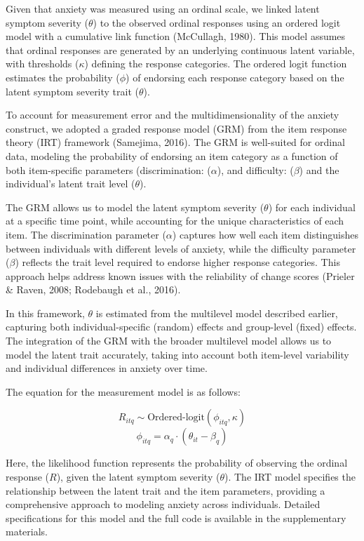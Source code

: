 \documentclass[
  man,floatsintext]{apa7}
\begin{document}
Given that anxiety was measured using an ordinal scale, we linked latent symptom severity (\(\theta\)) to the observed ordinal responses using an ordered logit model with a cumulative link function (McCullagh, 1980).
This model assumes that ordinal responses are generated by an underlying continuous latent variable, with thresholds (\(\kappa\)) defining the response categories.
The ordered logit function estimates the probability (\(\phi\)) of endorsing each response category based on the latent symptom severity trait (\(\theta\)).

To account for measurement error and the multidimensionality of the anxiety construct, we adopted a graded response model (GRM) from the item response theory (IRT) framework (Samejima, 2016).
The GRM is well-suited for ordinal data, modeling the probability of endorsing an item category as a function of both item-specific parameters (discrimination: (\(\alpha\)), and difficulty: (\(\beta\)) and the individual's latent trait level (\(\theta\)).

The GRM allows us to model the latent symptom severity (\(\theta\)) for each individual at a specific time point, while accounting for the unique characteristics of each item.
The discrimination parameter (\(\alpha\)) captures how well each item distinguishes between individuals with different levels of anxiety, while the difficulty parameter (\(\beta\)) reflects the trait level required to endorse higher response categories.
This approach helps address known issues with the reliability of change scores (Prieler \& Raven, 2008; Rodebaugh et al., 2016).

In this framework, \(\theta\) is estimated from the multilevel model described earlier, capturing both individual-specific (random) effects and group-level (fixed) effects.
The integration of the GRM with the broader multilevel model allows us to model the latent trait accurately, taking into account both item-level variability and individual differences in anxiety over time.

The equation for the measurement model is as follows:

\[R_{itq} \sim \text{Ordered-logit}(\phi_{itq}, \kappa)\]
\[\phi_{itq} = \alpha_q \cdot (\theta_{it} - \beta_q)\]

Here, the likelihood function represents the probability of observing the ordinal response (\(R\)), given the latent symptom severity (\(\theta\)).
The IRT model specifies the relationship between the latent trait and the item parameters, providing a comprehensive approach to modeling anxiety across individuals.
Detailed specifications for this model and the full code is available in the supplementary materials.
\end{document}

